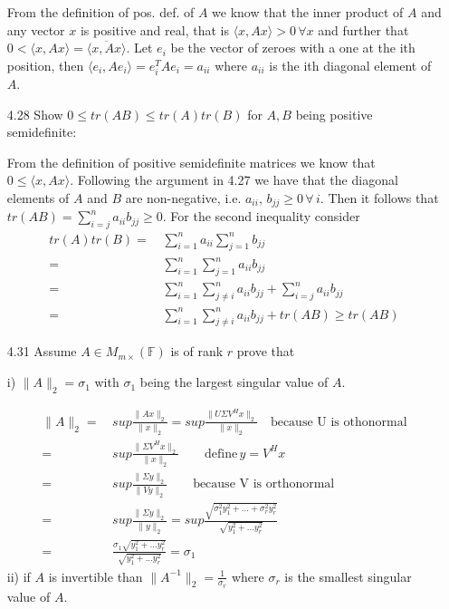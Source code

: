 \documentclass[letterpaper,12pt]{article}
\theoremstyle{definition}
\begin{document}
\begin{enumerate}
From the definition of pos. def. of $A$ we know that the inner product of $A$ and any vector $x$ is positive and real, that is  $\langle x, Ax\rangle > 0\, \forall x$ and  further that $0< \langle x, Ax\rangle = \overline{\langle x, Ax\rangle}$.  Let $e_i$ be the vector of zeroes with a one at the ith position, then $\langle e_i, Ae_i\rangle = e_i^T A e_i = a_{ii} $ where $a_{ii}$ is the ith diagonal element of $A$.

\item[4.28] Show $0 \leq tr(AB) \leq tr(A)tr(B)$ for $A, B$ being positive semidefinite:

From the definition of positive semidefinite matrices we know that $0\leq \langle x, Ax \rangle$. Following the argument in 4.27 we have that the diagonal elements of $A$ and $B$ are non-negative, i.e. $a_{ii},\, b_{jj}\geq 0\, \forall \,i$. Then it follows that $tr(AB) = \sum_{i=j}^na_{ii}b_{jj} \geq 0$.
For the second inequality consider
\begin{align*}
tr(A)tr(B) =&\, \sum_{i=1}^na_{ii}  \sum_{j=1}^nb_{jj}\\
=&\,  \sum_{i=1}^n \sum_{j=1}^n a_{ii} b_{jj}\\
=&\, \sum_{i=1}^n \sum_{j\neq i}^n a_{ii} b_{jj} + \sum_{i=j}^na_{ii} b_{jj}\\
=&\, \sum_{i=1}^n \sum_{j\neq i}^n a_{ii} b_{jj} + tr(AB) \geq tr(AB)
\end{align*}

\item[4.31] Assume $A \in M_{m\times }(\mathbb{F})$ is of rank $r$ prove that

i) $\| A\|_2 = \sigma_1$ with $\sigma_1$ being the largest singular value of $A$.

\begin{align*}
\| A\|_2 =&\, sup \frac{\|Ax\|_2}{\|x\|_2} = sup \frac{\|U\Sigma V^Hx\|_2}{\|x\|_2} \quad \text{because U is othonormal}\\
=&\, sup\frac{\|\Sigma V^Hx\|_2}{\|x\|_2} \qquad \text{define}\, y=V^Hx\\
=&\, sup\frac{\|\Sigma y\|_2}{\|Vy\|_2} \qquad \text{because V is orthonormal} \\
=&\, sup\frac{\|\Sigma y\|_2}{\|y\|_2} = sup\frac{\sqrt{\sigma_1^2y_1^2 +...+\sigma_r^2y_r^2}}{\sqrt{y_1^2 + ...y_r^2}} \\
=&\, \frac{\sigma_1\sqrt{y_1^2 + ...y_r^2}}{\sqrt{y_1^2 + ...y_r^2}} = \sigma_1
\end{align*}
ii) if $A$ is invertible than $\|A^{-1}\|_2 = \frac{1}{\sigma_r}$ where $\sigma_r$ is the smallest singular value of $A$.


\end{enumerate}
\end{document}
